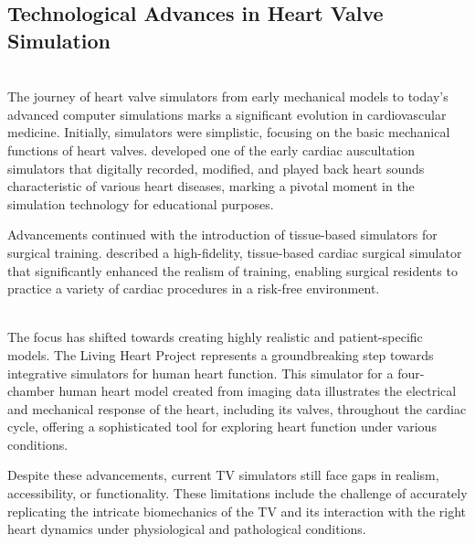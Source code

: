 \subsection{Technological Advances in Heart Valve Simulation}

\\
The journey of heart valve simulators from early mechanical models to today's advanced computer simulations marks a significant evolution in cardiovascular medicine. Initially, simulators were simplistic, focusing on the basic mechanical functions of heart valves.  developed one of the early cardiac auscultation simulators that digitally recorded, modified, and played back heart sounds characteristic of various heart diseases, marking a pivotal moment in the simulation technology for educational purposes.

Advancements continued with the introduction of tissue-based simulators for surgical training.  described a high-fidelity, tissue-based cardiac surgical simulator that significantly enhanced the realism of training, enabling surgical residents to practice a variety of cardiac procedures in a risk-free environment.

\\
The focus has shifted towards creating highly realistic and patient-specific models. The Living Heart Project represents a groundbreaking step towards integrative simulators for human heart function. This simulator for a four-chamber human heart model created from imaging data illustrates the electrical and mechanical response of the heart, including its valves, throughout the cardiac cycle, offering a sophisticated tool for exploring heart function under various conditions. 

Despite these advancements, current \gls{TV} simulators still face gaps in realism, accessibility, or functionality. These limitations include the challenge of accurately replicating the intricate biomechanics of the \gls{TV} and its interaction with the right heart dynamics under physiological and pathological conditions.



